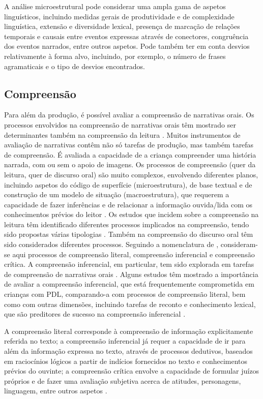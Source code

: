 \documentclass[output=paper,colorlinks,citecolor=brown,booklanguage=portuguese]{langscibook}
\begin{document}
A análise microestrutural pode considerar uma ampla gama de aspetos linguísticos, incluindo medidas gerais de produtividade e de complexidade linguística, extensão e diversidade lexical, presença de marcação de relações temporais e causais entre eventos expressas através de conectores, congruência dos eventos narrados, entre outros aspetos. Pode também ter em conta desvios relativamente à forma alvo, incluindo, por exemplo, o número de frases agramaticais e o tipo de desvios encontrados.

\subsection{Compreensão} Para além da produção, é possível avaliar a compreensão de narrativas orais. Os processos envolvidos na compreensão de narrativas orais têm mostrado ser determinantes também na compreensão da leitura \citep{Paris2003}. Muitos instrumentos de avaliação de narrativas contêm não só tarefas de produção, mas também tarefas de compreensão. É avaliada a capacidade de a criança compreender uma história narrada, com ou sem o apoio de imagens. Os processos de compreensão (quer da leitura, quer de discurso oral) são muito complexos, envolvendo diferentes planos, incluindo aspetos do código de superfície (microestrutura), de base textual e de construção de um modelo de situação (macroestrutura), que requerem a capacidade de fazer inferências e de relacionar a informação ouvida/lida com os conhecimentos prévios do leitor \citep{Graesser1997}. Os estudos que incidem sobre a compreensão na leitura têm identificado diferentes processos implicados na compreensão, tendo sido propostas várias tipologias \citep{Catala2001, Giasson2005, Ribeiro2010}. Também na compreensão do discurso oral têm sido considerados diferentes processos. Seguindo a nomenclatura de \citealt{Ribeiro2010}, consideram-se aqui processos de compreensão literal, compreensão inferencial e compreensão crítica. A compreensão inferencial, em particular, tem sido explorada em tarefas de compreensão de narrativas orais \citep{Paris2003, Dawes2017}. Alguns estudos têm mostrado a importância de avaliar a compreensão inferencial, que está frequentemente comprometida em crianças com PDL, comparando-a com processos de compreensão literal, bem como com outras dimensões, incluindo tarefas de reconto e conhecimento lexical, que são preditores de sucesso na compreensão inferencial \citep{Dawes2017}.

A compreensão literal corresponde à compreensão de informação explicitamente referida no texto; a compreensão inferencial já requer a capacidade de ir para além da informação expressa no texto, através de processos dedutivos, baseados em raciocínios lógicos a partir de indícios fornecidos no texto e conhecimentos prévios do ouvinte; a compreensão crítica envolve a capacidade de formular juízos próprios e de fazer uma avaliação subjetiva acerca de atitudes, personagens, linguagem, entre outros aspetos \citep{Ribeiro2010}. 
\end{document}
